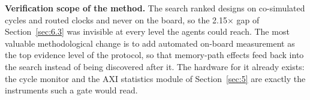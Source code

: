 \textbf{Verification scope of the method.} The search ranked designs on co-simulated cycles and routed clocks and never on the board, so the 2.15$\times$ gap of Section~\ref{sec:6.3} was invisible at every level the agents could reach. The most valuable methodological change is to add automated on-board measurement as the top evidence level of the protocol, so that memory-path effects feed back into the search instead of being discovered after it. The hardware for it already exists: the cycle monitor and the AXI statistics module of Section~\ref{sec:5} are exactly the instruments such a gate would read.
